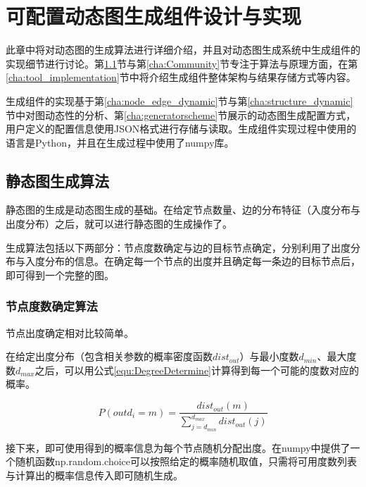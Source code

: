 
\chapter{可配置动态图生成组件设计与实现}
\label{cha:chapter03}

此章中将对动态图的生成算法进行详细介绍，并且对动态图生成系统中生成组件的实现细节进行讨论。第\ref{cha:staticgraph}节与第\ref{cha:Community}节专注于算法与原理方面，在第\ref{cha:tool_implementation}节中将介绍生成组件整体架构与结果存储方式等内容。

生成组件的实现基于第\ref{cha:node_edge_dynamic}节与第\ref{cha:structure_dynamic}节中对图动态性的分析、第\ref{cha:generatorscheme}节展示的动态图生成配置方式，用户定义的配置信息使用JSON格式进行存储与读取。生成组件实现过程中使用的语言是Python，并且在生成过程中使用了numpy库。

\section{静态图生成算法}
\label{cha:staticgraph}

静态图的生成是动态图生成的基础。在给定节点数量、边的分布特征（入度分布与出度分布）之后，就可以进行静态图的生成操作了。

生成算法包括以下两部分：节点度数确定与边的目标节点确定\cite{FastSGG}，分别利用了出度分布与入度分布的信息。在确定每一个节点的出度并且确定每一条边的目标节点后，即可得到一个完整的图。

\subsection{节点度数确定算法}

节点出度确定相对比较简单。

在给定出度分布（包含相关参数的概率密度函数$dist_{out}$）与最小度数$d_{min}$、最大度数$d_{max}$之后，可以用公式\ref{equ:DegreeDetermine}计算得到每一个可能的度数对应的概率。

\vspace{-8mm}

\begin{equation}
  \label{equ:DegreeDetermine}
  P\left(outd_i=m\right)=\frac{dist_{out}(m)}{\sum\limits_{j=d_{min}}^{d_{max}}dist_{out}(j)}
\end{equation}

接下来，即可使用得到的概率信息为每个节点随机分配出度。在numpy中提供了一个随机函数np.random.choice可以按照给定的概率随机取值，只需将可用度数列表与计算出的概率信息传入即可随机生成。

